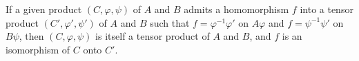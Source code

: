 If a given product $(C, \varphi, \psi)$ of $A$ and $B$ admits a homomorphism $f$ into a tensor product $(C', \varphi', \psi')$ of $A$ and $B$ such that $f = \varphi^{-1}\varphi'$ on $A\varphi$ and $f = \psi^{-1}\psi'$ on $B\psi$, then $(C, \varphi, \psi)$ is itself a tensor product of $A$ and $B$, and $f$ is an isomorphism of $C$ onto $C'$.
